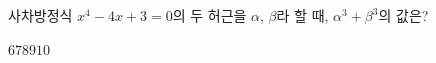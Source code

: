 사차방정식 $x^4-4x+3=0$의 두 허근을 $\alpha$, $\beta$라 할 때, $\alpha^3+\beta^3$의 값은?
\begin{choices32}{$6$}{$7$}{$8$}{$9$}{$10$}\end{choices32}
